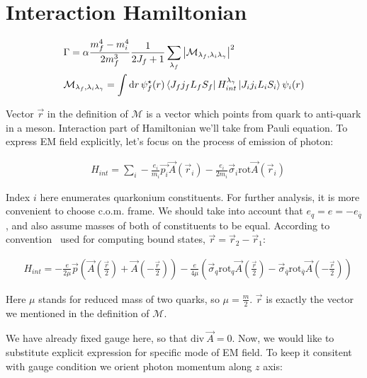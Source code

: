 \section{Interaction Hamiltonian} \label{sec:app:hint}

\begin{align}
    &\Gamma = \alpha \frac{m_f^4 - m_i^4}{2 m_f^3} \frac{1}{2J_f + 1} \sum_{\lambda_f} \abs{\mathcal{M}_{\lambda_f, \lambda_i \lambda_\gamma}}^2 \\
    &\mathcal{M}_{\lambda_f, \lambda_i \lambda_\gamma} = \int \dd{r} \psi_f^\star(r) \bra{J_f j_f L_f S_f} H_{int}^{\lambda_\gamma} \ket{J_i j_i L_i S_i} \psi_i(r)
\end{align}

Vector $\vec{r}$ in the definition of $\mathcal{M}$ is a vector which points from quark to anti-quark in a meson. Interaction part of Hamiltonian we'll take from Pauli equation. To express EM field explicitly, let's focus on the process of emission of photon:

\begin{align}
    &H_{int} = \sum_{i} -\frac{e_i}{m_i} \vec{p_i} \vec{A}(\vec{r}_i) - \frac{e_i}{2 m_i} \vec{\sigma}_i \mathrm{rot} \vec{A}(\vec{r}_i)
\end{align}

Index $i$ here enumerates quarkonium constituents. For further analysis, it is more convenient to choose c.o.m. frame. We should take into account that $e_q = e = - e_{\overline{q}}$, and also assume masses of both of constituents to be equal. According to convention~\cite{deng-charm} used for computing bound states, $\vec{r} = \vec{r}_2 - \vec{r}_1$:

\begin{align}
    &H_{int} = -\frac{e}{2 \mu} \vec{p} \left( \vec{A}(\frac{\vec{r}}{2}) + \vec{A}(-\frac{\vec{r}}{2}) \right) - \frac{e}{4 \mu} \left( \vec{\sigma}_{q} \mathrm{rot}_{q} \vec{A}(\frac{\vec{r}}{2}) - \vec{\sigma}_{\overline{q}} \mathrm{rot}_{\overline{q}} \vec{A}(-\frac{\vec{r}}{2}) \right)
\end{align}

Here $\mu$ stands for reduced mass of two quarks, so $\mu = \frac{m}{2}$. $\vec{r}$ is exactly the vector we mentioned in the definition of $\mathcal{M}$.

We have already fixed gauge here, so that $\mathrm{div}~\vec{A} = 0$.\cite{tong-qed}
Now, we would like to substitute explicit expression for specific mode of
EM field. To keep it consitent with gauge condition we orient photon
momentum along $z$ axis:

